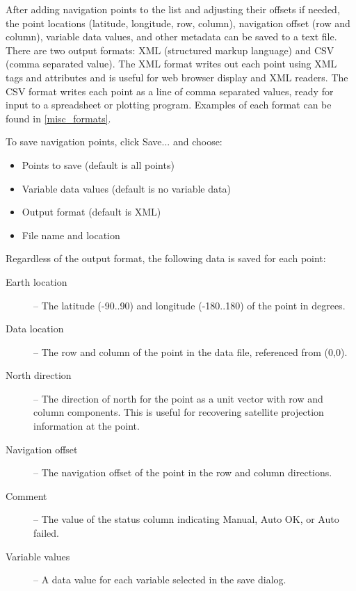 After adding navigation points to the list and adjusting their
offsets if needed, the point locations (latitude, longitude, row,
column), navigation offset (row and column), variable data
values, and other metadata can be saved to a text file.  There
are two output formats: XML (structured markup language) and CSV
(comma separated value).  The XML format writes out each point
using XML tags and attributes and is useful for web browser
display and XML readers.  The CSV format writes each point as a
line of comma separated values, ready for input to a spreadsheet
or plotting program.  Examples of each format can be found in
\autoref{misc_formats}.

To save navigation points, click {\gui Save...} and choose:
\begin{itemize}
 
  \item Points to save (default is all points)

  \item Variable data values (default is no variable data)

  \item Output format (default is XML)

  \item File name and location

\end{itemize}
Regardless of the output format, the following data is saved for
each point:
\begin{description}

  \item[Earth location] -- The latitude (-90..90) and longitude
  (-180..180) of the point in degrees.

  \item[Data location] -- The row and column of the point in the
  data file, referenced from (0,0).

  \item[North direction] -- The direction of north for the point
  as a unit vector with row and column components.  This is
  useful for recovering satellite projection information at the
  point.

  \item[Navigation offset] -- The navigation offset of the point
  in the row and column directions.

  \item[Comment] -- The value of the status column indicating
  {\gui Manual}, {\gui Auto OK}, or {\gui Auto failed}.

  \item[Variable values] -- A data value for each variable
  selected in the save dialog.

\end{description}

